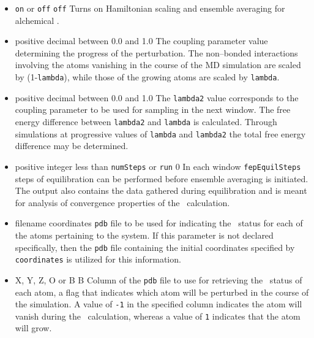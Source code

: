 \begin{itemize}

\item
{}
{{\tt on} or {\tt off}}
{{\tt off}}
{Turns on Hamiltonian scaling and ensemble averaging for alchemical \FEP.}

\item
{}
{positive decimal between 0.0 and 1.0}
{The coupling parameter value determining the progress of the
perturbation. The non--bonded interactions involving the atoms vanishing
in the course of the MD simulation are scaled by (1-{\tt lambda}), while
those of the growing atoms are scaled by {\tt lambda}.}

\item
{}
{positive decimal between 0.0 and 1.0}
{The {\tt lambda2} value corresponds to the coupling parameter to be
used for sampling in the next window.  The free energy difference
between {\tt lambda2} and {\tt lambda} is calculated.  Through simulations
at progressive values of {\tt lambda} and {\tt lambda2} the total free
energy difference may be determined.}

\item
{}
{positive integer less than {\tt numSteps} or {\tt run}}
{0}
{In each window {\tt fepEquilSteps} steps of equilibration can be
performed before ensemble averaging is initiated. The output also contains
the data gathered during equilibration and is meant for analysis of
convergence properties of the \FEP\ calculation.}

\item
{}
{filename}
{coordinates}
{{\tt pdb} file to be used for indicating the \FEP\ status for each of
the atoms pertaining to the system. 
If this parameter is not declared specifically, then the
{\tt pdb} file containing the initial coordinates specified by
{\tt coordinates} is utilized for this information.}

\item
{}
{X, Y, Z, O or B}
{B}
{Column of the {\tt pdb} file to use for retrieving the \FEP\ status 
of each atom, \ie a flag that indicates which atom will be perturbed
in the course of the simulation.
A value of {\tt -1} in the specified column indicates the atom will
vanish during the \FEP\ calculation, whereas a value of {\tt 1} 
indicates that the atom will grow.}


\end{itemize}
